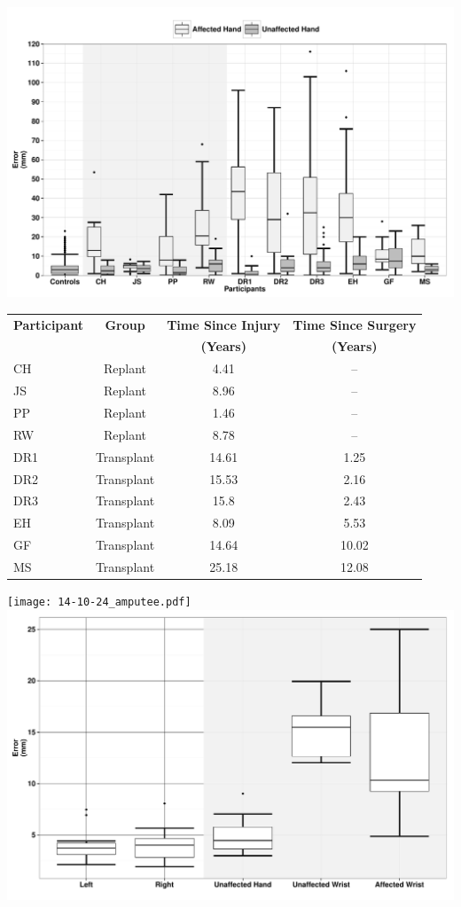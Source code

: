\documentclass{article}
\begin{document}
\hspace{-3cm}
\includegraphics[scale=.7]{14-10-21_transplant.pdf}
\vspace{.75cm}
\begin{center}
\begin{tabular}{lccc}
\textbf{Participant}&\textbf{Group}&\textbf{Time Since Injury}&\textbf{Time Since Surgery} \\
&&\textbf{(Years)}&\textbf{(Years)}\\
\hline
CH&Replant&4.41&--\\
JS&Replant&8.96&--\\
PP&Replant&1.46&--\\
RW&Replant&8.78&--\\
DR1&Transplant&14.61&1.25\\
DR2&Transplant&15.53&2.16\\
DR3&Transplant&15.8&2.43\\
EH&Transplant&8.09&5.53\\
GF&Transplant&14.64&10.02\\
MS&Transplant&25.18&12.08\\
\hline

\end{tabular}
\end{center}
\newpage
\vspace{-2cm}
\hspace{-2cm}
\texttt{[image: 14-10-24\_amputee.pdf]}\\
\vspace{2cm}
\includegraphics[scale=.5]{14_8_11_ampgroup.pdf}
\end{document}
